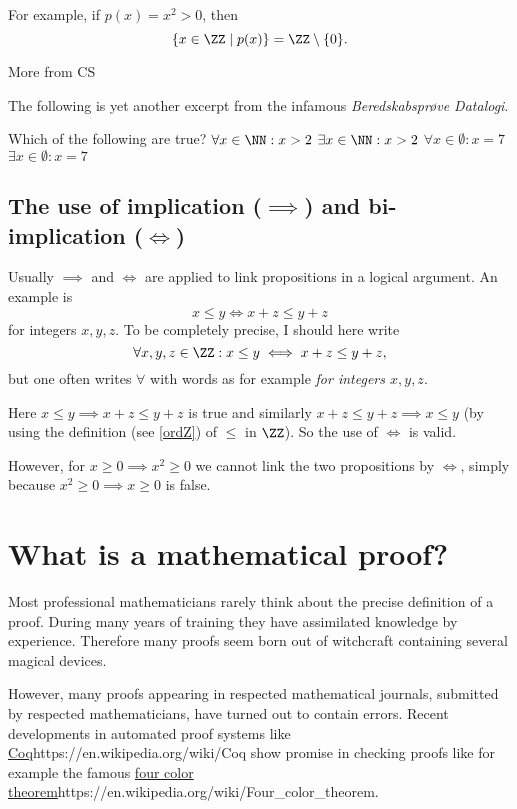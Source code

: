 \documentclass{article}
\begin{document}
For example, if $p(x) = x^2 > 0$, then
$$
\{x\in \ZZ \mid p(x)\} = \ZZ\setminus \{0\}.
$$

\begin{hideinbutton}{More from CS}

The following is yet another excerpt from the infamous \emph{Beredskabsprøve Datalogi}.

\begin{quiz}
\question
Which of the following are true?
$\forall x\in \NN: x > 2$
$\exists x\in \NN: x > 2$
$\forall x\in \emptyset: x = 7$
$\exists x\in \emptyset: x = 7$
\end{quiz}
\end{hideinbutton}


\subsection{The use of implication ($\implies$) and bi-implication ($\iff$)}

Usually $\implies$ and $\iff$ are applied to link propositions in a logical argument. An example
is
$$
x \leq y \iff x + z \leq y + z
$$
for integers $x, y, z$. To be completely precise, I should here write
$$
\forall x, y, z\in \ZZ: x \leq y \iff x + z \leq y + z,
$$
but one often writes $\forall$ with words as for example \emph{for integers $x, y, z$}.


Here $x \leq y\implies x + z \leq y + z$ is true and similarly
$x + z \leq y + z \implies x \leq y$ (by using the definition (see \eqref{ordZ}) of $\leq$ in $\ZZ$). So the
use of $\iff$ is valid.

However, for $x \geq 0 \implies x^2 \geq 0$ we cannot link the two propositions by $\iff$,
simply because $x^2 \geq 0 \implies x \geq 0$ is false.


\section{What is a mathematical proof?}


Most professional mathematicians rarely think about the precise
definition of a proof. During many years of training they have
assimilated knowledge by experience. Therefore many proofs
seem born out of witchcraft containing several magical
devices.

However, many proofs appearing in
respected mathematical journals, submitted by respected mathematicians, have turned out to contain
errors. Recent developments in automated proof systems
like \url{Coq}{https://en.wikipedia.org/wiki/Coq} show
promise in checking proofs like for example the famous
\url{four color theorem}{https://en.wikipedia.org/wiki/Four_color_theorem}.
\end{document}
